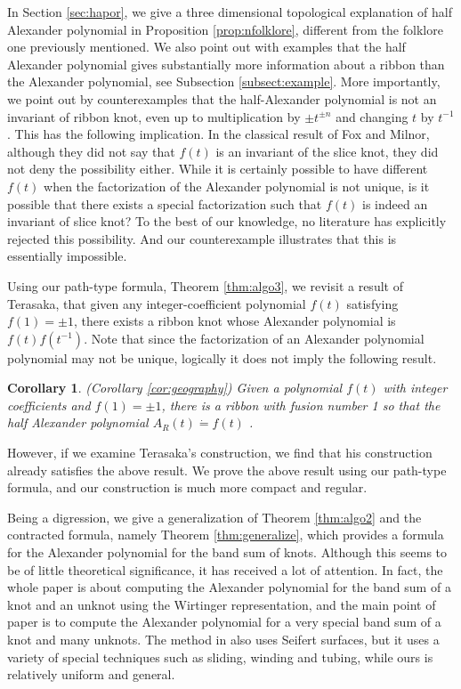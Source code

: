 \documentclass{amsart}
\newtheorem{cor}[thm]{Corollary}
\theoremstyle{definition}
\theoremstyle{remark}
\numberwithin{equation}{subsection}
\begin{document}
In Section \ref{sec:hapor}, we give a three dimensional topological explanation of half Alexander polynomial in Proposition \ref{prop:nfolklore}, different from the folklore one previously mentioned. 
We also point out with examples that the half Alexander polynomial gives substantially more information about a ribbon than the Alexander polynomial, see Subsection \ref{subsect:example}. 
More importantly, we point out by counterexamples that the half-Alexander polynomial is not an invariant of ribbon knot, even up to multiplication by $\pm t^{\pm n}$ and changing $ t $ by $ t^{-1} $. This has the following implication. In the classical result of Fox and Milnor\cite{FoxMilnor}, although they did not say that $f(t)$ is an invariant of the slice knot, they did not deny the possibility either. While it is certainly possible to have different $f(t)$ when the factorization of the Alexander polynomial is not unique, is it possible that there exists a special factorization such that $f(t)$ is indeed an invariant of slice knot? To the best of our knowledge, no literature has explicitly rejected this possibility. And our counterexample illustrates that this is essentially impossible.

Using our path-type formula, Theorem \ref{thm:algo3}, we revisit a result of Terasaka\cite{Terasaka1959}, that given any integer-coefficient polynomial $ f(t) $ satisfying $ f(1) = \pm 1 $, there exists a ribbon knot whose Alexander polynomial is $ f(t)f(t^{-1}) $. Note that since the factorization of an Alexander polynomial polynomial may not be unique, logically it does not imply the following result.
\begin{cor}\label{thm:converse0} (Corollary \ref{cor:geography})
Given a polynomial $ f(t) $ with integer coefficients and $ f(1) = \pm 1 $, there is a ribbon with fusion number 1 so that the half Alexander polynomial $ A_R (t) \dot{=} f(t) $ .
\end{cor}
However, if we examine Terasaka's construction\cite{Terasaka1959}, we find that his construction already satisfies the above result. We prove the above result using our path-type formula, and our construction is much more compact and regular.

Being a digression, we give a generalization of Theorem \ref{thm:algo2} and the contracted formula, namely Theorem \ref{thm:generalize}, which provides a formula for the Alexander polynomial for the band sum of knots. Although this seems to be of little theoretical significance, it has received a lot of attention. In fact, the whole paper \cite{Terasaka1959} is about computing the Alexander polynomial for the band sum of a knot and an unknot using the Wirtinger representation, and the main point of paper \cite{KishimotoShibuyaTsukamotoIshikawa2021} is to compute the Alexander polynomial for a very special band sum of a knot and many unknots. The method in \cite{KishimotoShibuyaTsukamotoIshikawa2021} also uses Seifert surfaces, but it uses a variety of special techniques such as sliding, winding and tubing, while ours is relatively uniform and general.
\end{document}
